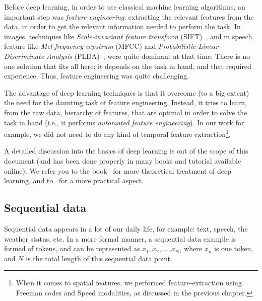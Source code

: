 
\par Before deep learning, in order to use classical machine learning algorithms, an important step was \textit{feature engineering}: extracting the relevant features from the data, in order to get the relevant information needed to perform the task. In images, techniques like \textit{Scale-invariant feature transform} (SIFT)~\citep{lowe1999object}, and in speech, feature like \textit{Mel-frequency cepstrum} (MFCC) and \textit{Probabilistic  Linear  Discriminate  Analysis} (PLDA)~\citep{narang2015speech}, were quite dominant at that time. There is no one solution that fits all here; it depends on the task in hand, and that required experience. Thus, feature engineering was quite challenging.

The advantage of deep learning techniques is that it overcome (to a big extent) the need for the daunting task of feature engineering. Instead, it tries to learn, from the raw data, hierarchy of features, that are optimal in order to solve the task in hand (i.e., it performs \textit{automated feature engineering}). In our work for example, we did not need to do any kind of temporal feature extraction\footnote{When it comes to spatial features, we performed feature-extraction using Freeman codes and Speed modalities, as discussed in the previous chapter.}.

\par A detailed discussion into the basics of deep learning is out of the scope of this document (and has been done properly in many books and tutorial available online). We refer you to the book~\citep{Goodfellow-et-al-2016} for more theoretical treatment of deep learning, and to~\citep{chollet2017book,geron2017hands} for a more practical aspect.

\subsection{Sequential data} \label{sec:seq_data}
\par Sequential data appears in a lot of our daily life, for example: text, speech, the weather status, etc. In a more formal manner, a sequential data example is formed of tokens, and can be represented as $x_1, x_2, ..., x_N$, where $x_n$ is one token, and $N$ is the total length of this sequential data point.

